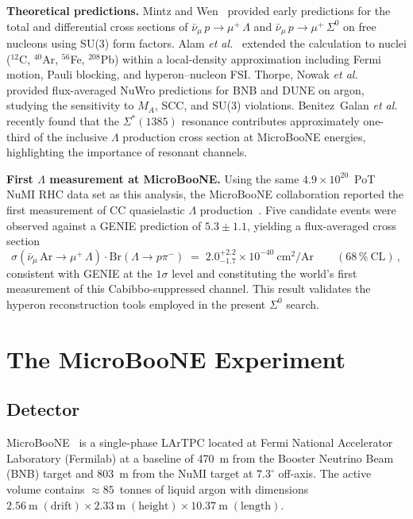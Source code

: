 \documentclass[12pt,a4paper]{article}
\begin{document}
\textbf{Theoretical predictions.}
Mintz and Wen~\cite{Mintz:2006un} provided early predictions for the
total and differential cross sections of
$\bar\nu_\mu\,p\to\mu^+\,\Lambda$ and
$\bar\nu_\mu\,p\to\mu^+\,\Sigma^0$ on free nucleons using SU(3) form
factors.  Alam \emph{et al.}~\cite{Alam:2014jza} extended the
calculation to nuclei ($^{12}$C, $^{40}$Ar, $^{56}$Fe, $^{208}$Pb)
within a local-density approximation including Fermi motion, Pauli
blocking, and hyperon--nucleon FSI.  Thorpe, Nowak \emph{et al.}~\cite{Thorpe:2020sbx}
provided flux-averaged NuWro predictions for BNB and DUNE on argon,
studying the sensitivity to $M_A$, SCC, and SU(3) violations.
Benitez~Galan \emph{et al.}~\cite{BenitezGalan:2023hyi} recently
found that the $\Sigma^*(1385)$ resonance contributes approximately
one-third of the inclusive $\Lambda$ production cross section at
MicroBooNE energies, highlighting the importance of resonant channels.

\textbf{First $\Lambda$ measurement at MicroBooNE.}
Using the same $4.9\times10^{20}$~PoT NuMI RHC data set
as this analysis, the MicroBooNE collaboration reported the first
measurement of CC quasielastic $\Lambda$
production~\cite{MicroBooNE:2022ctm}.  Five candidate events were
observed against a GENIE prediction of $5.3\pm1.1$, yielding a
flux-averaged cross section
\begin{equation}
  \sigma(\bar\nu_\mu\,\text{Ar}\to\mu^+\,\Lambda)\cdot
  \text{Br}(\Lambda\to p\pi^-)
  \;=\; 2.0^{+2.2}_{-1.7}\times10^{-40}~\text{cm}^2/\text{Ar}
  \qquad (68\,\%~\text{CL})\,,
  \label{eq:lambda_meas}
\end{equation}
consistent with GENIE at the $1\sigma$ level and constituting the
world's first measurement of this Cabibbo-suppressed channel.
This result validates the hyperon reconstruction tools employed in
the present $\Sigma^0$ search.

\section{The MicroBooNE Experiment}

\subsection{Detector}

MicroBooNE~\cite{Acciarri:2016smi} is a single-phase LArTPC located at
Fermi National Accelerator Laboratory (Fermilab) at a baseline of 470~m
from the Booster Neutrino Beam (BNB) target and 803~m from the NuMI
target at $7.3^\circ$ off-axis.  The active volume
contains $\approx 85$~tonnes of liquid argon with dimensions
$2.56~\text{m}\;(\text{drift}) \times 2.33~\text{m}\;(\text{height})
\times 10.37~\text{m}\;(\text{length})$.
\end{document}
